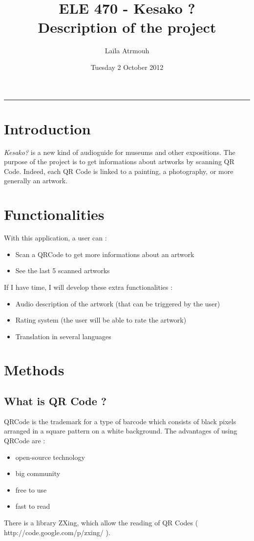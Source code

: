 \documentclass[a4paper, 12pt, final]{article}
\title{ ELE 470 - Kesako ? \\ Description of the project }
\author{ Laïla Atrmouh }
\date{Tuesday 2 October 2012}
\begin{document}
\maketitle  
   
\rule[0.5ex]{\textwidth}{0.1mm}

\section{Introduction}  
\emph{Kesako?} is a new kind of audioguide for museums and other expositions. The purpose of the project is to get informations about artworks by scanning QR Code. Indeed, each QR Code is linked to a painting, a photography, or more generally an artwork. 

\section{Functionalities}
With this application, a user can :
\begin{itemize}
\item Scan a QRCode to get more informations about an artwork
\item See the last 5 scanned artworks
\end {itemize}

If I have time, I will develop these extra functionalities :
\begin{itemize}
\item Audio description of the artwork (that can be triggered by the user)
\item Rating system (the user will be able to rate the artwork) 
\item Translation in several languages
\end{itemize}

\section {Methods}
\subsection{What is QR Code ?}
QRCode is the trademark for a type of barcode which consists of black pixels arranged in a square pattern on a white background. The advantages of using QRCode are :
\begin {itemize}
\item open-source technology
\item big community
\item free to use
\item fast to read
\end{itemize}  
There is a library ZXing, which allow the reading of QR Codes ( http://code.google.com/p/zxing/ ).  
\end{document}
